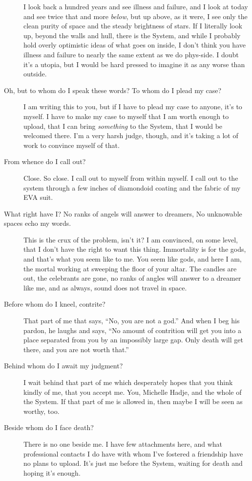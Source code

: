 \begin{description}
I look back a hundred years and see illness and failure, and I look at today and see twice that and more \emph{below}, but up above, as it were, I see only the clean purity of space and the steady brightness of stars. If I literally look up, beyond the walls and hull, there is the System, and while I probably hold overly optimistic ideas of what goes on inside, I don't think you have illness and failure to nearly the same extent as we do phys-side. I doubt it's a utopia, but I would be hard pressed to imagine it as any worse than outside.
\item[Oh, but to whom do I speak these words? To whom do I plead my case?]
I am writing this to you, but if I have to plead my case to anyone, it's to myself. I have to make my case to myself that I am worth enough to upload, that I can bring \emph{something} to the System, that I would be welcomed there. I'm a very harsh judge, though, and it's taking a lot of work to convince myself of that.
\item[From whence do I call out?]
Close. So close. I call out to myself from within myself. I call out to the system through a few inches of diamondoid coating and the fabric of my EVA suit.
\item[What right have I? No ranks of angels will answer to dreamers, No unknowable spaces echo my words.]
This is the crux of the problem, isn't it? I am convinced, on some level, that I don't have the right to want this thing. Immortality is for the gods, and that's what you seem like to me. You seem like gods, and here I am, the mortal working at sweeping the floor of your altar. The candles are out, the celebrants are gone, no ranks of angles will answer to a dreamer like me, and as always, sound does not travel in space.
\item[Before whom do I kneel, contrite?]
That part of me that says, ``No, you are not a god.'' And when I beg his pardon, he laughs and says, ``No amount of contrition will get you into a place separated from you by an impossibly large gap. Only death will get there, and you are not worth that.''
\item[Behind whom do I await my judgment?]
I wait behind that part of me which desperately hopes that you think kindly of me, that you accept me. You, Michelle Hadje, and the whole of the System. If that part of me is allowed in, then maybe I will be seen as worthy, too.
\item[Beside whom do I face death?]
There is no one beside me. I have few attachments here, and what professional contacts I do have with whom I've fostered a friendship have no plans to upload. It's just me before the System, waiting for death and hoping it's enough.

\end{description}
